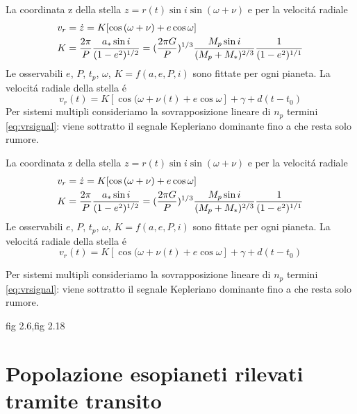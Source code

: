 \begin{workout}
La coordinata z della stella $z=r(t)\sin{i}\sin{(\omega+\nu)}$ e per la velocit\'a radiale
\begin{align}
&v_r=\dot{z}=K[\cos{(\omega+\nu)}+e\cos{\omega}]\label{eq:vrsignal}\\
&K=\frac{2\pi}{P}\frac{a_*\sin{i}}{(1-e^2)^{1/2}}=(\frac{2\pi G}{P})^{1/3}\frac{M_p\sin{i}}{(M_p+M_*)^{2/3}}\frac{1}{(1-e^2)^{1/1}}
\end{align}
Le osservabili $e$, $P$, $t_p$, $\omega$, $K=f(a,e,P,i)$ sono fittate per ogni pianeta.
La velocit\'a radiale della stella \'e
\begin{equation}
v_r(t)=K[\cos{(\omega+\nu(t)}+e\cos{\omega}]+\gamma+d(t-t_0)
\end{equation}
Per sistemi multipli consideriamo la sovrapposizione lineare di $n_p$ termini \eqref{eq:vrsignal}: viene sottratto il segnale Kepleriano dominante fino a che resta solo rumore.
\end{workout}

\begin{workout}
La coordinata z della stella $z=r(t)\sin{i}\sin{(\omega+\nu)}$ e per la velocit\'a radiale
\begin{align}
&v_r=\dot{z}=K[\cos{(\omega+\nu)}+e\cos{\omega}]\label{eq:vrsignal}\\
&K=\frac{2\pi}{P}\frac{a_*\sin{i}}{(1-e^2)^{1/2}}=(\frac{2\pi G}{P})^{1/3}\frac{M_p\sin{i}}{(M_p+M_*)^{2/3}}\frac{1}{(1-e^2)^{1/1}}
\end{align}
Le osservabili $e$, $P$, $t_p$, $\omega$, $K=f(a,e,P,i)$ sono fittate per ogni pianeta.
La velocit\'a radiale della stella \'e
\begin{equation}
v_r(t)=K[\cos{(\omega+\nu(t)}+e\cos{\omega}]+\gamma+d(t-t_0)
\end{equation}
\end{workout}

Per sistemi multipli consideriamo la sovrapposizione lineare di $n_p$ termini \eqref{eq:vrsignal}: viene sottratto il segnale Kepleriano dominante fino a che resta solo rumore.

\begin{workout}
fig 2.6,fig 2.18
\end{workout}


\section{Popolazione esopianeti rilevati tramite transito}

